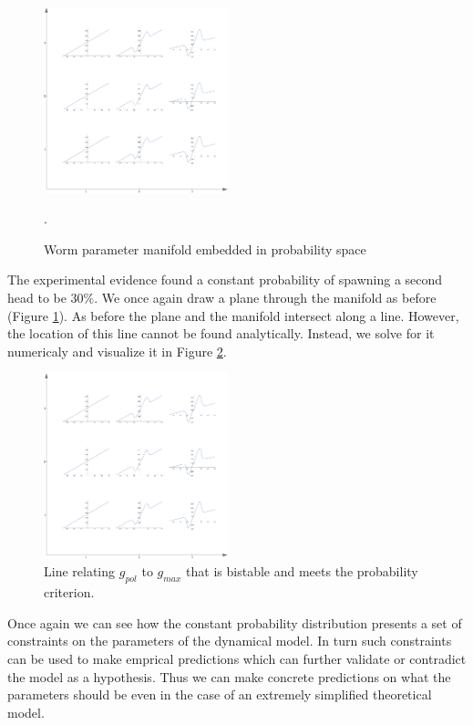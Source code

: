 \documentclass[letterpaper]{article}
\begin{document}
\begin{figure}[t]
\begin{center}
\includegraphics[width=2.1in,angle=0]{./worm_params.png}
\caption{Worm parameter manifold embedded in probability space}.
\label{worm_prob}
\end{center}
\end{figure}

The experimental evidence found a constant probability of spawning a second head to 
be $30\%$. We once again draw a plane through the manifold as before
(Figure \ref{worm_prob}). As before the plane and the manifold intersect along 
a line. However, the location of this line cannot be found analytically. Instead,
we solve for it numericaly and visualize it in Figure \ref{worm_line}.

\begin{figure}[t]
\begin{center}
\includegraphics[width=2.1in,angle=0]{./worm_params.png}
\caption{Line relating $g_{pol}$ to $g_{max}$ that is bistable and meets the probability
criterion.}
\label{worm_line}
\end{center}
\end{figure}

Once again we can see how the constant probability distribution presents a set of 
constraints on the parameters of the dynamical model. In turn such constraints can
be used to make emprical predictions which can further validate or contradict the
model as a hypothesis. Thus we can make concrete predictions on what the parameters
should be even in the case of an extremely simplified theoretical model.
\end{document}
